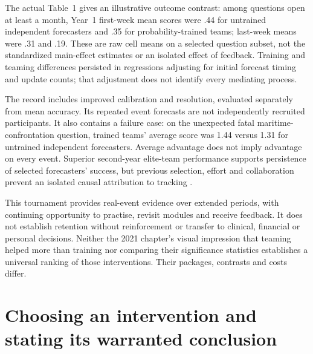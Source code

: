 The actual Table~1 gives an illustrative outcome contrast: among
questions open at least a month, Year~1 first-week mean scores were
.44 for untrained independent forecasters and .35 for probability-trained
teams; last-week means were .31 and .19. These are raw cell means on
a selected question subset, not the standardized main-effect estimates
or an isolated effect of feedback. Training and teaming differences
persisted in regressions adjusting for initial forecast timing and
update counts; that adjustment does not identify every mediating process.

The record includes improved calibration and resolution, evaluated
separately from mean accuracy. Its repeated event forecasts are not
independently recruited participants. It also contains a failure case:
on the unexpected fatal maritime-confrontation question, trained teams'
average score was 1.44 versus 1.31 for untrained independent forecasters.
Average advantage does not imply advantage on every event. Superior
second-year elite-team performance supports persistence of selected
forecasters' success, but previous selection, effort and collaboration
prevent an isolated causal attribution to tracking
\cite[online pp.~5--9]{MellersEtAl2014ForecastTraining}.

This tournament provides real-event evidence over extended periods,
with continuing opportunity to practise, revisit modules and receive
feedback. It does not establish retention without reinforcement or
transfer to clinical, financial or personal decisions. Neither the
2021 chapter's visual impression that teaming helped more than training
nor comparing their significance statistics establishes a universal
ranking of those interventions. Their packages, contrasts and costs
differ.

\section{Choosing an intervention and stating its warranted conclusion}
\label{sec:p19-r153-method}

